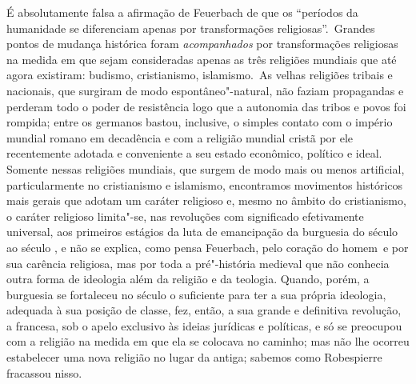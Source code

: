 É absolutamente falsa a afirmação
de Feuerbach
de que os ``períodos da humanidade se diferenciam apenas por
transformações religiosas''. \textbar{}\,Grandes pontos de mudança histórica
foram \emph{acompanhados} por transformações religiosas na medida em
que sejam consideradas apenas as três religiões mundiais que até agora %
existiram: budismo, cristianismo, islamismo.\,\textbar{} As velhas religiões
tribais e nacionais, que surgiram de modo espontâneo"-natural, \textbar{} não
faziam propagandas e perderam \textbar{} todo o poder de resistência logo que a %
autonomia das tribos e povos foi rompida; entre os germanos bastou,
inclusive, o simples contato com o império mundial romano em decadência e
com a religião mundial cristã por ele recentemente adotada e conveniente
a seu estado econômico, político e ideal. Somente nessas religiões
mundiais, que surgem de modo mais ou menos artificial, particularmente
no cristianismo e islamismo, encontramos movimentos históricos mais
gerais que adotam um caráter religioso e, \textbar{} mesmo no âmbito do
cristianismo, \textbar{} o caráter religioso limita"-se, nas revoluções com
significado efetivamente universal, aos primeiros estágios da luta de
emancipação da burguesia do século  ao século , e não se
explica, como pensa
Feuerbach,
pelo coração do homem\est\ e por sua carência religiosa, mas por toda a
pré"-história medieval que não conhecia outra forma de ideologia além da
religião e da teologia. Quando, porém, a burguesia se
fortaleceu no século  o suficiente para ter a sua própria ideologia, adequada à
sua posição de classe, fez, então, a sua grande e definitiva revolução,
a francesa, sob o apelo exclusivo às ideias jurídicas e políticas, e só se
preocupou com a religião na medida em que ela se colocava no caminho;
mas não lhe ocorreu estabelecer uma nova religião no lugar da antiga; \textbar{}
sabemos como Robespierre fracassou nisso. \textbar{}

